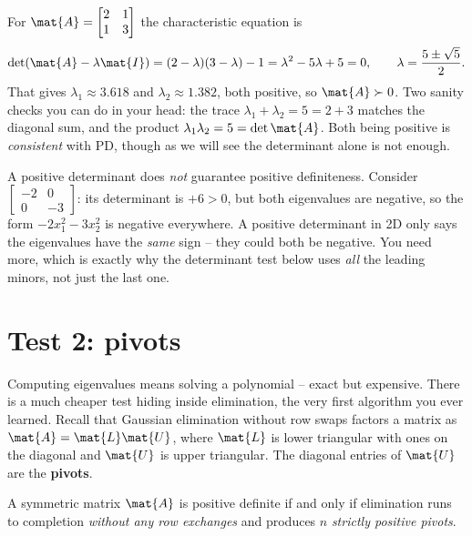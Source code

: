 \begin{example}
\label{ch27:ex-eig}
For $\mat{A} = \begin{bmatrix} 2 & 1 \\ 1 & 3 \end{bmatrix}$ the characteristic equation is
\[
  \det(\mat{A} - \lambda\mat{I}) = (2-\lambda)(3-\lambda) - 1 = \lambda^2 - 5\lambda + 5 = 0,
  \qquad \lambda = \frac{5 \pm \sqrt 5}{2}.
\]
That gives $\lambda_1 \approx 3.618$ and $\lambda_2 \approx 1.382$, both positive, so $\mat{A}\succ
0$. Two sanity checks you can do in your head: the trace $\lambda_1 + \lambda_2 = 5 = 2+3$ matches
the diagonal sum, and the product $\lambda_1\lambda_2 = 5 = \det\mat{A}$. Both being positive is
\emph{consistent} with PD, though as we will see the determinant alone is not enough.
\end{example}

\begin{trapbox}
A positive determinant does \emph{not} guarantee positive definiteness. Consider
$\begin{bmatrix} -2 & 0 \\ 0 & -3 \end{bmatrix}$: its determinant is $+6 > 0$, but both eigenvalues
are negative, so the form $-2x_1^2 - 3x_2^2$ is negative everywhere. A positive determinant in 2D
only says the eigenvalues have the \emph{same} sign -- they could both be negative. You need more,
which is exactly why the determinant test below uses \emph{all} the leading minors, not just the
last one.
\end{trapbox}

\section{Test 2: pivots}

Computing eigenvalues means solving a polynomial -- exact but expensive. There is a much cheaper
test hiding inside elimination, the very first algorithm you ever learned. Recall that Gaussian
elimination without row swaps factors a matrix as $\mat{A} = \mat{L}\mat{U}$, where $\mat{L}$ is
lower triangular with ones on the diagonal and $\mat{U}$ is upper triangular. The diagonal entries
of $\mat{U}$ are the \textbf{pivots}.

\begin{theorem}
\label{ch27:thm-pivots}
A symmetric matrix $\mat{A}$ is positive definite if and only if elimination runs to completion
\emph{without any row exchanges} and produces $n$ \emph{strictly positive pivots}.
\end{theorem}

